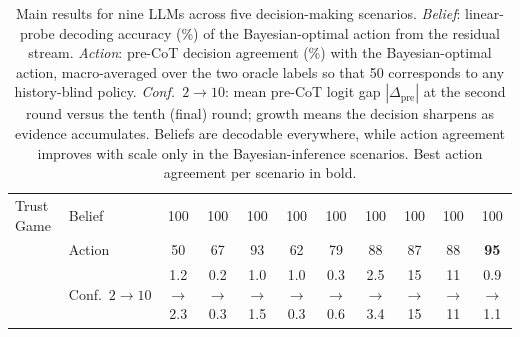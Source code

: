 \begin{table}[t]
{\begin{tabular}{llccccccccc}
\addlinespace
Trust Game & Belief & 100 & 100 & 100 & 100 & 100 & 100 & 100 & 100 & 100 \\
 & Action & 50 & 67 & 93 & 62 & 79 & 88 & 87 & 88 & \textbf{95} \\
 & Conf.\ $2{\to}10$ & 1.2$\to$2.3 & 0.2$\to$0.3 & 1.0$\to$1.5 & 1.0$\to$0.3 & 0.3$\to$0.6 & 2.5$\to$3.4 & 15$\to$15 & 11$\to$11 & 0.9$\to$1.1 \\
\bottomrule
\end{tabular}
}
\caption{Main results for nine LLMs across five decision-making scenarios. \emph{Belief}: linear-probe decoding accuracy (\%) of the Bayesian-optimal action from the residual stream. \emph{Action}: pre-CoT decision agreement (\%) with the Bayesian-optimal action, macro-averaged over the two oracle labels so that 50 corresponds to any history-blind policy. \emph{Conf.\ $2{\to}10$}: mean pre-CoT logit gap $|\Delta_{\mathrm{pre}}|$ at the second round versus the tenth (final) round; growth means the decision sharpens as evidence accumulates. Beliefs are decodable everywhere, while action agreement improves with scale only in the Bayesian-inference scenarios. Best action agreement per scenario in bold.}
\label{tab:main-results}
\end{table}